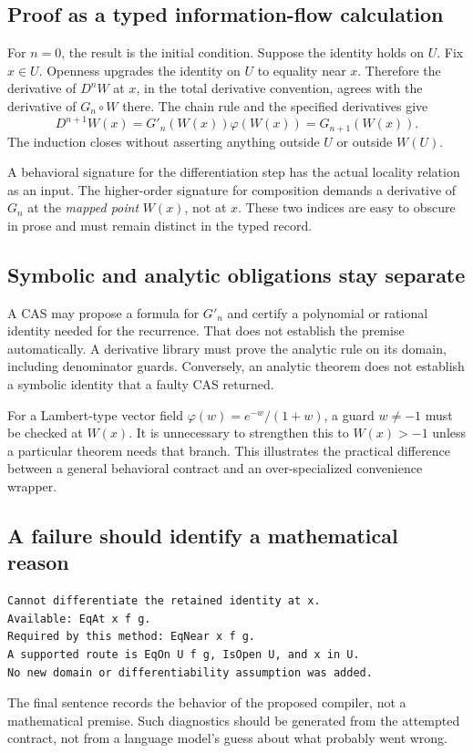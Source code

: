 \documentclass[11pt,letterpaper]{article}
\newcommand{\code}[1]{\texttt{\detokenize{#1}}}
\theoremstyle{definition}
\theoremstyle{remark}
\begin{document}
\subsection{Proof as a typed information-flow calculation}
For $n=0$, the result is the initial condition. Suppose the identity holds on
$U$. Fix $x\in U$. Openness upgrades the identity on $U$ to equality near $x$.
Therefore the derivative of $D^nW$ at $x$, in the total derivative convention,
agrees with the derivative of $G_n\circ W$ there. The chain rule and the
specified derivatives give
\[
 D^{n+1}W(x)=G'_n(W(x))\varphi(W(x))=G_{n+1}(W(x)).
\]
The induction closes without asserting anything outside $U$ or outside $W(U)$.

A behavioral signature for the differentiation step has the actual locality
relation as an input. The higher-order signature for composition demands a
derivative of $G_n$ at the \emph{mapped point} $W(x)$, not at $x$. These two
indices are easy to obscure in prose and must remain distinct in the typed
record.

\subsection{Symbolic and analytic obligations stay separate}
A CAS may propose a formula for $G'_n$ and certify a polynomial or rational
identity needed for the recurrence. That does not establish the
\code{HasDerivAt} premise automatically. A derivative library must prove the
analytic rule on its domain, including denominator guards. Conversely, an
analytic theorem does not establish a symbolic identity that a faulty CAS
returned.

For a Lambert-type vector field
$\varphi(w)=e^{-w}/(1+w)$, a guard $w\ne-1$ must be checked at $W(x)$. It is
unnecessary to strengthen this to $W(x)>-1$ unless a particular theorem needs
that branch. This illustrates the practical difference between a general
behavioral contract and an over-specialized convenience wrapper.

\subsection{A failure should identify a mathematical reason}
\begin{lstlisting}
Cannot differentiate the retained identity at x.
Available: EqAt x f g.
Required by this method: EqNear x f g.
A supported route is EqOn U f g, IsOpen U, and x in U.
No new domain or differentiability assumption was added.
\end{lstlisting}
The final sentence records the behavior of the proposed compiler, not a
mathematical premise. Such diagnostics should be generated from the attempted
contract, not from a language model's guess about what probably went wrong.
\end{document}
